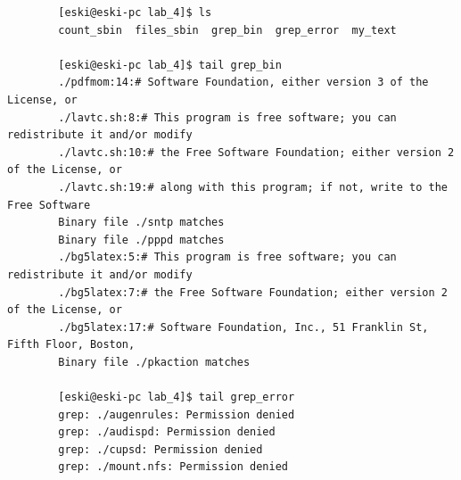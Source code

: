 \documentclass{article}
\begin{document}
\begin{enumerate}
\begin{verbatim}
		[eski@eski-pc lab_4]$ ls
		count_sbin  files_sbin  grep_bin  grep_error  my_text
		
		[eski@eski-pc lab_4]$ tail grep_bin 
		./pdfmom:14:# Software Foundation, either version 3 of the License, or
		./lavtc.sh:8:# This program is free software; you can redistribute it and/or modify
		./lavtc.sh:10:# the Free Software Foundation; either version 2 of the License, or
		./lavtc.sh:19:# along with this program; if not, write to the Free Software
		Binary file ./sntp matches
		Binary file ./pppd matches
		./bg5latex:5:# This program is free software; you can redistribute it and/or modify
		./bg5latex:7:# the Free Software Foundation; either version 2 of the License, or
		./bg5latex:17:# Software Foundation, Inc., 51 Franklin St, Fifth Floor, Boston,
		Binary file ./pkaction matches
		
		[eski@eski-pc lab_4]$ tail grep_error 
		grep: ./augenrules: Permission denied
		grep: ./audispd: Permission denied
		grep: ./cupsd: Permission denied
		grep: ./mount.nfs: Permission denied
		
		\end{verbatim}
		

\end{enumerate}
\end{document}
